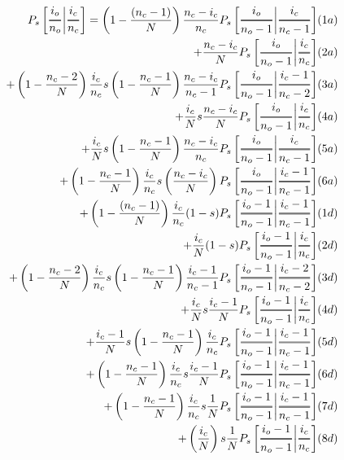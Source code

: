 \documentclass[preview]{standalone}
\newcommand{\Dfrac}[2]{%
  \ooalign{%
    $\genfrac{}{}{1.2pt}0{#1}{#2}$\cr%
    $\color{white}\genfrac{}{}{.4pt}0{\phantom{#1}}{\phantom{#2}}$}%
}
\newcommand{\cond}{\middle\vert}
\begin{document}
\begin{equation*}
  \begin{aligned}
    P_s\left[ \Dfrac{i_o}{n_o} \cond \Dfrac{i_c}{n_c} \right]
    = \left(1-\frac{(n_c-1)}{N}\right)\frac{n_c-i_c}{n_c} P_s\left[ \Dfrac{i_o}{n_o-1} \cond
      \Dfrac{i_c}{n_c-1} \right]& (1a)\\ %
      + \frac{n_c-i_c}{N} P_s\left[ \Dfrac{i_o}{n_o-1} \cond \Dfrac{i_c}{n_c} \right]& (2a)\\ %
    + \left(1-\frac{n_c-2}{N}\right) \frac{i_c}{n_c} s  \left(1-\frac{n_c-1}{N}\right)
      \frac{n_c-i_c}{n_c-1} P_s\left[ \Dfrac{i_o}{n_o-1} \cond \Dfrac{i_c-1}{n_c-2} \right]& (3a) \\ %
    + \frac{i_c}{N} s  \frac{n_c-i_c}{N}  P_s\left[ \Dfrac{i_o}{n_o-1} \cond \Dfrac{i_c}{n_c}
      \right]  &  (4a) \\ %
    + \frac{i_c}{N} s  \left(1-\frac{n_c-1}{N}\right) \frac{n_c-i_c}{n_c}  P_s\left[
        \Dfrac{i_o}{n_o-1} \cond \Dfrac{i_c}{n_c-1} \right]& (5a) \\ %
    + \left(1-\frac{n_c-1}{N}\right) \frac{i_c}{n_c} s  \left(\frac{ n_c-i_c }{N}\right) P_s\left[
        \Dfrac{i_o}{n_o-1} \cond \Dfrac{i_c-1}{n_c-1} \right]& (6a) \\ %
    + \left(1-\frac{(n_c-1)}{N}\right)\frac{i_c}{n_c} (1-s) P_s\left[ \Dfrac{i_o-1}{n_o-1} \cond
      \Dfrac{i_c-1}{n_c-1} \right]& (1d) \\ %
      + \frac{i_c}{N} (1-s) P_s\left[ \Dfrac{i_o-1}{n_o-1} \cond \Dfrac{i_c}{n_c} \right]& (2d) \\ %
    + \left(1-\frac{n_c-2}{N}\right) \frac{i_c}{n_c} s  \left(1-\frac{n_c-1}{N}\right)
      \frac{i_c-1}{n_c-1} P_s\left[ \Dfrac{i_o-1}{n_o-1} \cond \Dfrac{i_c-2}{n_c-2} \right]& (3d) \\ %
    + \frac{i_c}{N} s  \frac{i_c-1}{N}   P_s\left[ \Dfrac{i_o-1}{n_o-1} \cond \Dfrac{i_c}{n_c}
      \right]& (4d) \\ %
    + \frac{i_c-1}{N} s  \left(1-\frac{n_c-1}{N}\right) \frac{i_c}{n_c}   P_s\left[
        \Dfrac{i_o-1}{n_o-1} \cond \Dfrac{i_c-1}{n_c-1} \right]& (5d) \\ %
    + \left(1-\frac{n_c-1}{N}\right) \frac{i_c}{n_c} s \frac{i_c-1}{N} P_s\left[
        \Dfrac{i_o-1}{n_o-1} \cond \Dfrac{i_c-1}{n_c-1} \right]& (6d) \\ %
    + \left(1-\frac{n_c-1}{N}\right) \frac{i_c}{n_c} s \frac{1}{N} P_s\left[
        \Dfrac{i_o-1}{n_o-1} \cond \Dfrac{i_c-1}{n_c-1} \right]& (7d) \\ %
    + \left(\frac{i_c}{N}\right) s \frac{1}{N} P_s\left[
        \Dfrac{i_o-1}{n_o-1} \cond \Dfrac{i_c}{n_c} \right]& (8d) \\ %
  \end{aligned}
\end{equation*}
\end{document}
